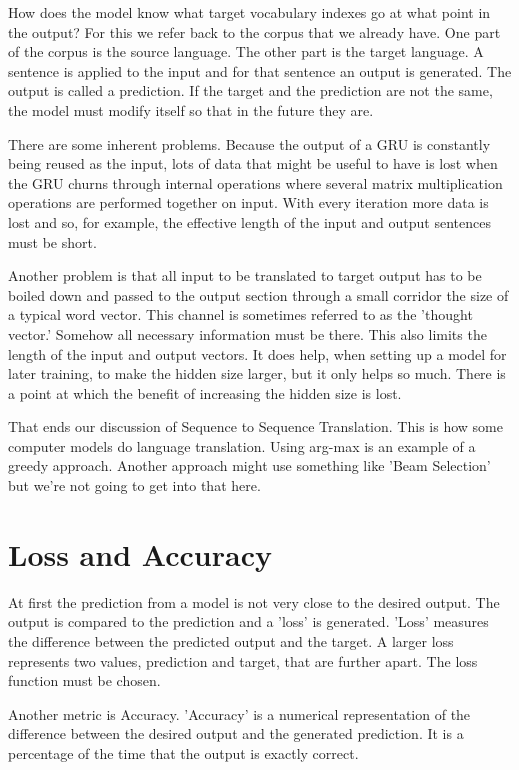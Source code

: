 How does the model know what target vocabulary indexes go at what point in the output? For this we refer back to the corpus that we already have. One part of the corpus is the source language. The other part is the target language. A sentence is applied to the input and for that sentence an output is generated. The output is called a prediction. If the target and the prediction are not the same, the model must modify itself so that in the future they are.

There are some inherent problems. Because the output of a GRU is constantly being reused as the input, lots of data that might be useful to have is lost when the GRU churns through internal operations where several matrix multiplication operations are performed together on input. With every iteration more data is lost and so, for example, the effective length of the input and output sentences must be short. 

Another problem is that all input to be translated to target output has to be boiled down and 
passed to the output section through a small corridor the size of a typical word vector. This channel is sometimes referred to as the 'thought vector.' Somehow all necessary information must be there. This also limits the length of the input and output vectors. It does help, when setting
up a model for later training, to make the hidden size larger, but it only helps so much. There is a point at which the benefit of increasing the hidden size is lost.

That ends our discussion of Sequence to Sequence Translation. This is how some computer models do language translation. Using arg-max is an example of a greedy approach. Another approach might use something like 'Beam Selection' but we're not going to get into that here.


\section{Loss and Accuracy}

At first the prediction from a model is not very close to the desired output. The output is compared to the prediction and a 'loss' is generated. 'Loss' measures the difference between the predicted output and the target. A larger loss represents two values, prediction and target, that are further apart. The loss function must be chosen. 


Another metric is Accuracy. 'Accuracy' is a numerical representation of the difference between the desired output and the generated prediction. It is a percentage of the time that the output is exactly correct.

